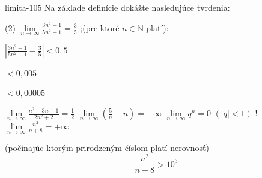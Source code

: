 \begin{defproblem}{limita-105}
Na základe definície dokážte nasledujúce tvrdenia:
\begin{tasks}(2)
    \task*
        $\lim\limits_{n \rightarrow \infty} \frac{3n^2 + 1}{5n^2 - 1} = \frac{3}{5}$
        ;(pre ktoré $n \in \mathbb{N}$ platí):

        \begin{enumerate*}
            \item $|\frac{3n^2 + 1}{5n^2 - 1} - \frac{3}{5} | < 0,5$
            \item $< 0,005$
            \item $< 0,00005$
        \end{enumerate*}

    \task $\lim\limits_{n \rightarrow \infty} \frac{n^2 + 3n + 1}{2n^2 + 2} = \frac{1}{2}$
    \task $\lim\limits_{n \rightarrow \infty} (\frac{5}{n}-n)=-\infty$
    \task $\lim\limits_{n \rightarrow \infty} q^n=0$  $(|q|<1)$
    \task! $\lim\limits_{n \rightarrow \infty} \frac{n^2}{n + 8} = +\infty$

        (počínajúc ktorým prirodzeným číslom platí nerovnosť)
        \[ \frac{n^2}{n+8} > 10^3 \]
\end{tasks}


\end{defproblem}
